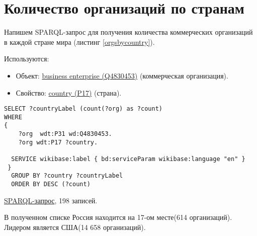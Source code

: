 \section*{Количество организаций по странам}

Напишем SPARQL-запрос для получения количества коммерческих организаций в каждой стране мира  (листинг \ref{orgsbycountry}).

Используются:
\begin{itemize}
    \item Объект: \href{https://www.wikidata.org/wiki/Q4830453}{business enterprise (Q4830453)} (коммерческая организация).
    \item Свойство: \href{https://www.wikidata.org/wiki/Property:P17}{country (P17)} (страна).
\end{itemize}

\begin{lstlisting}[language=SPARQL,label=orgsbycountry,caption=Количество организаций в каждой стране мира]
SELECT ?countryLabel (count(?org) as ?count)
WHERE
{
    ?org  wdt:P31 wd:Q4830453.
    ?org wdt:P17 ?country.

  SERVICE wikibase:label { bd:serviceParam wikibase:language "en" }
 }
  GROUP BY ?country ?countryLabel
  ORDER BY DESC (?count)
\end{lstlisting}

\href{https://query.wikidata.org/#SELECT%20%3FcountryLabel%20%28count%28%3Forg%29%20as%20%3Fcount%29%0AWHERE%0A%7B%0A%20%20%20%20%3Forg%20%20wdt%3AP31%20wd%3AQ4830453.%0A%20%20%20%20%3Forg%20wdt%3AP17%20%3Fcountry.%0A%0A%20%20SERVICE%20wikibase%3Alabel%20%7B%20bd%3AserviceParam%20wikibase%3Alanguage%20%22en%22%20%7D%0A%20%7D%0A%20%20GROUP%20BY%20%3Fcountry%20%3FcountryLabel%0A%20%20ORDER%20BY%20DESC%20%28%3Fcount%29%0A}{SPARQL-запрос}, 198 записей.
	
В полученном списке Россия находится на 17-ом месте(614 организаций). Лидером является США(14 658 организаций). 
